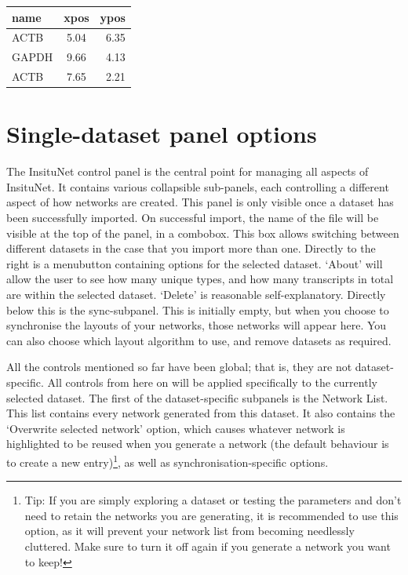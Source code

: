 \documentclass[a4paper,12pt]{article}
\begin{document}
\begin{center}
\begin{tabular}{ l c r }
	\centering
	name & xpos & ypos \\ \hline
	ACTB & 5.04 & 6.35 \\
	GAPDH & 9.66 & 4.13 \\
	ACTB & 7.65 & 2.21 \\
\end{tabular}
\end{center}

\section{Single-dataset panel options}

The InsituNet control panel is the central point for managing all aspects of InsituNet. It contains various collapsible sub-panels, each controlling a different aspect of how networks are created. This panel is only visible once a dataset has been successfully imported. On successful import, the name of the file will be visible at the top of the panel, in a combobox. This box allows switching between different datasets in the case that you import more than one. Directly to the right is a menubutton containing options for the selected dataset. `About' will allow the user to see how many unique types, and how many transcripts in total are within the selected dataset. `Delete' is reasonable self-explanatory. Directly below this is the sync-subpanel. This is initially empty, but when you choose to synchronise the layouts of your networks, those networks will appear here. You can also choose which layout algorithm to use, and remove datasets as required. 

All the controls mentioned so far have been global; that is, they are not dataset-specific. All controls from here on will be applied specifically to the currently selected dataset. The first of the dataset-specific subpanels is the Network List. This list contains every network generated from this dataset. It also contains the `Overwrite selected network' option, which causes whatever network is highlighted to be reused when you generate a network (the default behaviour is to create a new entry)\footnote{Tip: If you are simply exploring a dataset or testing the parameters and don't need to retain the networks you are generating, it is recommended to use this option, as it will prevent your network list from becoming needlessly cluttered. Make sure to turn it off again if you generate a network you want to keep!}, as well as synchronisation-specific options.
\end{document}
